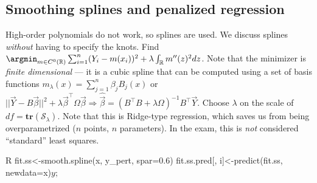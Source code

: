 \subsection{Smoothing splines and penalized regression}\label{subsec:smoothing_splines_and_penalized_regression}
\begin{sectionbox}\nospacing{}
High-order polynomials do not work, so splines are used. We discuss splines \emph{without} having to specify the knots.
Find $\argmin_{m \in C^{0}(\mathbb{R})} \sum_{i=1}^{n}(Y_{i} - m(x_{i}))^{2} + \lambda \int_{\mathbb{R}}m''(z)^{2} dz$.
Note that the minimizer is \emph{finite dimensional} --- it is a cubic spline that can be computed using a set of basis functions $m_{\lambda}(x) = \sum_{j=1}^{n}\beta_{j}B_{j}(x)$ or $||\vec{Y} - B\vec{\beta}||^{2}+\lambda \vec{\beta}^{\top}\Omega\vec{\beta} \Rightarrow \hat{\vec{\beta}} = {(B^{\top}B + \lambda\Omega)}^{-1}B^{\top}\vec{Y}$.
Choose $\lambda$ on the scale of $df = \mathbf{tr}(\mathcal{S}_{\lambda})$.
Note that this is Ridge-type regression, which saves us from being overparametrized ($n$ points, $n$ parameters).
In the exam, this is \emph{not} considered ``standard'' least squares.
  \begin{mintlinebox}{R}
  fit.ss<-smooth.spline(x, y_pert, spar=0.6)
  fit.ss.pred[, i]<-predict(fit.ss, newdata=x)$y ; $
  \end{mintlinebox}
\end{sectionbox}

